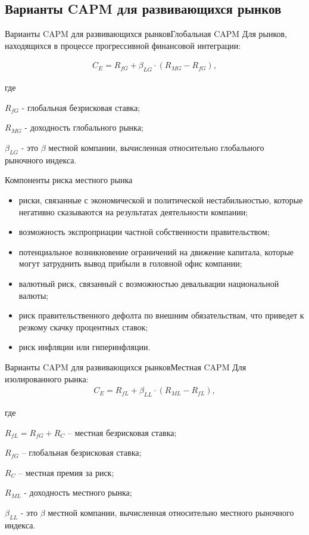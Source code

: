 \documentclass[_Venture_p2.tex]{subfiles}
\begin{document}
\subsection{Варианты CAPM для развивающихся рынков}
\begin{frame}{Варианты CAPM для развивающихся рынков}{Глобальная CAPM}
Для рынков, находящихся в процессе прогрессивной финансовой интеграции:

\begin{align}
C_E=R_{fG}+\beta_{LG} \cdot (R_{MG}-R_{fG}),
\end{align}

где 

$R_{fG}$ - глобальная безрисковая ставка;

$R_{MG}$ - доходность глобального рынка;

$\beta_{LG}$ - это $\beta$ местной компании, вычисленная относительно глобального рыночного индекса.
\end{frame}

\begin{frame}[allowframebreaks]{Компоненты риска местного рынка}{}
\begin{itemize}
	\item риски, связанные с экономической и политической нестабильностью, которые негативно сказываются на результатах деятельности компании;
	\item возможность экспроприации частной собственности правительством;
	
	\pagebreak
	\item потенциальное возникновение ограничений на движение капитала, которые могут затруднить вывод прибыли в головной офис компании;
	\item валютный риск, связанный с возможностью девальвации национальной валюты;
	\pagebreak
	\item риск правительственного дефолта по внешним обязательствам, что приведет к резкому скачку процентных ставок;
	\item риск инфляции или гиперинфляции.
\end{itemize}
\end{frame}



\begin{frame}{Варианты CAPM для развивающихся рынков}{Местная CAPM}
Для изолированного рынка:
\begin{align}
C_E=R_{fL}+\beta_{LL} \cdot (R_{ML}-R_{fL}),
\end{align}

где 

$R_{fL}=R_{fG}+R_C$ – местная безрисковая ставка;

$R_{fG}$ – глобальная безрисковая ставка;

$R_C$ – местная премия за риск;

$R_{ML}$ - доходность местного рынка;

$\beta_{LL}$ - это $\beta$ местной компании, вычисленная относительно местного рыночного индекса.
\end{frame}
\end{document}
